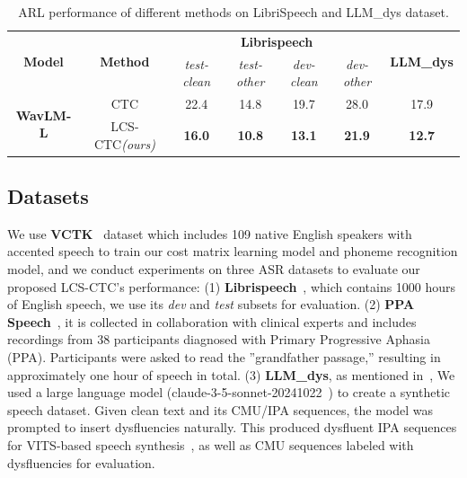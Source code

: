 \begin{table}[ht]
\centering
\begin{tabular}{c|c|cccc|c}
\toprule
\multirow{2}{*}{\textbf{Model}} & \multirow{2}{*}{\textbf{Method}} 
& \multicolumn{4}{c|}{\textbf{Librispeech}} & \multirow{2}{*}{\textbf{LLM\_dys}} \\
& & \textit{test-clean} & \textit{test-other} & \textit{dev-clean} & \textit{dev-other} & \\
\midrule
\multirow{2}{*}{\textbf{WavLM-L}} 
& CTC      & 22.4 & 14.8& 19.7 & 28.0 & 17.9 \\
& LCS-CTC\textit{(ours)}  &\textbf{16.0}  & \textbf{10.8} & \textbf{13.1} & \textbf{21.9} & \textbf{12.7} \\
\bottomrule
\end{tabular}
\caption{ARL performance of different methods on LibriSpeech and LLM\_dys dataset.}
\label{tab:arl-loss}
    \vspace{-10pt}
\end{table}


\subsection{Datasets}
We use \textbf{VCTK}~\cite{yamagishi2019cstr-vctk} dataset which includes 109 native English speakers with accented speech to train our cost matrix learning model and phoneme recognition model, and we conduct experiments on three ASR datasets to evaluate our proposed LCS-CTC's performance: (1) \textbf{Librispeech}~\cite{7178964}, which contains 1000 hours of English speech, we use its \textit{dev} and \textit{test} subsets for evaluation. (2) \textbf{PPA
Speech}~\cite{gorno2011classification-ppa}, it is collected in collaboration with clinical experts and includes recordings from 38 participants diagnosed with
Primary Progressive Aphasia (PPA). Participants were asked to
read the ”grandfather passage,” resulting in approximately one
hour of speech in total. (3) \textbf{LLM\_dys}, as mentioned in~\cite{zhang2025analysisevaluationsyntheticdata}, We used a large language model (claude-3-5-sonnet-20241022~\cite{anthropic2024claude}) to create a synthetic speech dataset. Given clean text and its CMU/IPA sequences, the model was prompted to insert dysfluencies naturally. This produced dysfluent IPA sequences for VITS-based speech synthesis~\cite{kim2021conditionalvariationalautoencoderadversarial}, as well as CMU sequences labeled with dysfluencies for evaluation. 

